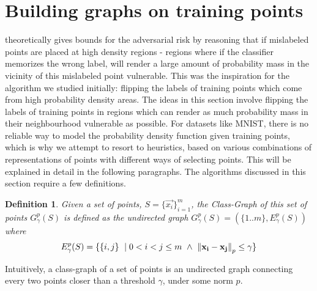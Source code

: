 \documentclass[12pt, oneside]{book}
\newtheorem{definition}{Definition}
\begin{document}

\section{Building graphs on training points}

\citet{sanyal2021how} theoretically gives bounds for the adversarial risk by
reasoning that if mislabeled points are placed at high density regions - regions
where if the classifier memorizes the wrong label, will render a large amount of
probability mass in the vicinity of this mislabeled point vulnerable. This was
the inspiration for the algorithm we studied initially: flipping the labels of
training points which come from high probability density areas. The ideas in
this section involve flipping the labels of training points in regions which can
render as much probability mass in their neighbourhood vulnerable as possible.
For datasets like MNIST, there is no reliable way to model the probability
density function given training points, which is why we attempt to resort to
heuristics, based on various combinations of representations of points with
different ways of selecting points. This will be explained in detail in the
following paragraphs. The algorithms discussed in this section require a few
definitions.

\begin{definition}
    Given a set of points, $S=\{\vec{x_i}\}_{i=1}^m$, the Class-Graph of this
    set of points $G_\gamma^{p}(S)$ is defined as the undirected graph
    $G_\gamma^{p}(S) = (\{1..m\}, E_\gamma^p(S))$ where
    \begin{equation*}
        E_\gamma^p(S) =
        \{\{i, j\}~\mid 0 < i < j \leq m~\wedge~
        \mathrm{\left\lVert{\mathbf{x_i}}-{\mathbf{x_j}}\right\rVert}_p \leq \gamma \}
    \end{equation*}
    \label{def:class-graph}
\end{definition}
Intuitively, a class-graph of a set of points is an undirected graph connecting
every two points closer than a threshold $\gamma$, under some norm $p$.
\end{document}
